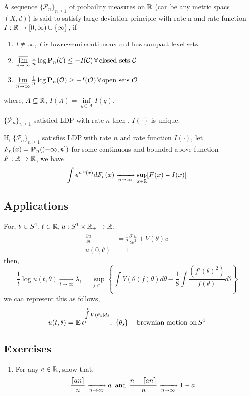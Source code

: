 \documentclass[main]{subfiles}
\begin{document}
\vspace{-0.25cm}
A sequence $\{\mathcal{P}_n\}_{n \geq 1}$ of probaility measures on $\R$ (can be any metric space $(X,d)$) is said to satisfy large deviation principle with rate n and rate function $I : \R \to \left[0,\infty\right) \cup \{\infty\}$, if
\begin{enumerate}
	\item $I \not\equiv \infty$, $I$ is lower-semi continuous and has compact level sets.
	\item $\uplim \limits_{n \to \infty}\frac{1}{n} \log \P_{n}(\mathcal{C}) \leq -I(\mathcal{C})\,\forall\,\text{closed sets}\,\, \mathcal{C}$
	\item  $\lowlim \limits_{n \to \infty}\frac{1}{n} \log \P_{n}(\mathcal{O}) \geq -I(\mathcal{O})\,\forall\,\text{open sets}\,\, \mathcal{O}$
\end{enumerate}
where, $A \subseteq \R$, $I(A)= \inf\limits_{y \in A}I(y)$.

\begin{theorem}
	$\{\mathcal{P}_n\}_{n \geq 1}$ satisfied LDP with rate $n$ then , $I(\cdot)$ is unique.
\end{theorem}
\begin{theorem}
	If, $\{\mathcal{P}_n\}_{n \geq 1}$ satisfies LDP with rate $n$ and rate function $I(\cdot)$, let $F_n(x) = \P_{n}(\left(-\infty,n \right])$ for some continuous and bounded above function $F : \R \to \R$, we have
	$$\int e^{n F(x)} dF_n(x) \xrightarrow[n \to \infty]{} \sup\limits_{x \in \R}[F(x) - I(x)]$$
\end{theorem}
\subsection*{Applications}
For, $\theta \in S^1,\,t \in \R,\,u : S^1 \times \R_{+} \to \R$,
\begin{align*}
	\frac{\partial u}{\partial t} & = \frac{1}{2}\frac{\partial^{2} u}{\partial \theta^2} + V(\theta)u \\
	u(0,\theta)                   & = 1
\end{align*}
then,  $$\frac{1}{t}\log u(t,\theta) \xrightarrow[t \to \infty]{} \lambda_1 = \sup\limits_{f \in \cdots} \left\{ \int V(\theta)f(\theta)d\theta - \frac{1}{8}\int \frac{(f'(\theta)^2)}{f(\theta)} d\theta \right\}$$
we can represent this as follows,
$$u(t,\theta) = \E\,e^{\int\limits_{0}^{t}V(\theta_{s})ds},\,\,\{\theta_{s}\} - \text{brownian motion on}\,S^1$$
\subsection*{Exercises}
\begin{enumerate}
	\item For any $a \in \R$, show that,
	      $$\frac{\ceil{an}}{n} \xrightarrow[n \to \infty]{} a \,\,\,\text{and}\,\,\,\frac{n-\ceil{an}}{n} \xrightarrow[n \to \infty]{} 1-a$$
\end{enumerate}
\end{document}
